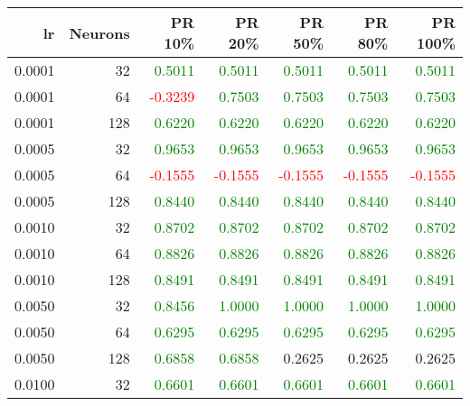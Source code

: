 \begin{tabular}{rrrrrrr}
\toprule
lr & Neurons & PR 10\% & PR 20\% & PR 50\% & PR 80\% & PR 100\% \\
\midrule
0.0001 & 32 & \textcolor{green} {0.5011} & \textcolor{green} {0.5011} & \textcolor{green} {0.5011} & \textcolor{green} {0.5011} & \textcolor{green} {0.5011} \\
0.0001 & 64 & \textcolor{red} {-0.3239} & \textcolor{green} {0.7503} & \textcolor{green} {0.7503} & \textcolor{green} {0.7503} & \textcolor{green} {0.7503} \\
0.0001 & 128 & \textcolor{green} {0.6220} & \textcolor{green} {0.6220} & \textcolor{green} {0.6220} & \textcolor{green} {0.6220} & \textcolor{green} {0.6220} \\
0.0005 & 32 & \textcolor{green} {0.9653} & \textcolor{green} {0.9653} & \textcolor{green} {0.9653} & \textcolor{green} {0.9653} & \textcolor{green} {0.9653} \\
0.0005 & 64 & \textcolor{red} {-0.1555} & \textcolor{red} {-0.1555} & \textcolor{red} {-0.1555} & \textcolor{red} {-0.1555} & \textcolor{red} {-0.1555} \\
0.0005 & 128 & \textcolor{green} {0.8440} & \textcolor{green} {0.8440} & \textcolor{green} {0.8440} & \textcolor{green} {0.8440} & \textcolor{green} {0.8440} \\
0.0010 & 32 & \textcolor{green} {0.8702} & \textcolor{green} {0.8702} & \textcolor{green} {0.8702} & \textcolor{green} {0.8702} & \textcolor{green} {0.8702} \\
0.0010 & 64 & \textcolor{green} {0.8826} & \textcolor{green} {0.8826} & \textcolor{green} {0.8826} & \textcolor{green} {0.8826} & \textcolor{green} {0.8826} \\
0.0010 & 128 & \textcolor{green} {0.8491} & \textcolor{green} {0.8491} & \textcolor{green} {0.8491} & \textcolor{green} {0.8491} & \textcolor{green} {0.8491} \\
0.0050 & 32 & \textcolor{green} {0.8456} & \textcolor{green} {1.0000} & \textcolor{green} {1.0000} & \textcolor{green} {1.0000} & \textcolor{green} {1.0000} \\
0.0050 & 64 & \textcolor{green} {0.6295} & \textcolor{green} {0.6295} & \textcolor{green} {0.6295} & \textcolor{green} {0.6295} & \textcolor{green} {0.6295} \\
0.0050 & 128 & \textcolor{green} {0.6858} & \textcolor{green} {0.6858} & \textcolor{blu} {0.2625} & \textcolor{blu} {0.2625} & \textcolor{blu} {0.2625} \\
0.0100 & 32 & \textcolor{green} {0.6601} & \textcolor{green} {0.6601} & \textcolor{green} {0.6601} & \textcolor{green} {0.6601} & \textcolor{green} {0.6601} \\

\end{tabular}
